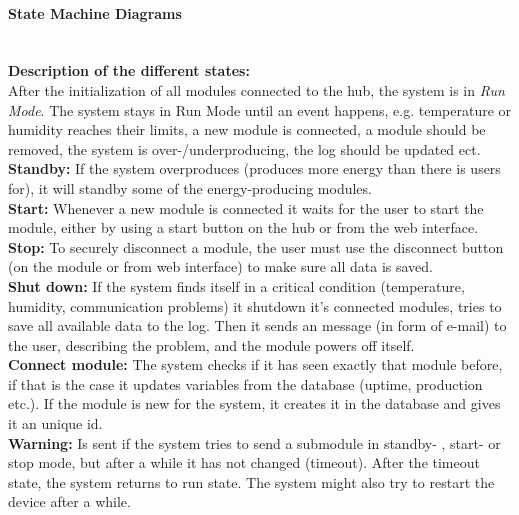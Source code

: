 			\paragraph{State Machine Diagrams}
				\textbf{ }\\
				\textbf{Description of the different states: }
				\\ After the initialization of all modules connected to the hub, the system is in  \textit{Run Mode}.
				The system stays in Run Mode until an event happens, e.g. temperature or humidity reaches their limits,
				a new module is connected, a module should be removed, the system is over-/underproducing, the log should be updated ect. 
				\\\textbf{Standby: }If the system overproduces (produces more energy than there is users for), it will standby some of the energy-producing modules.
				\\\textbf{Start: }Whenever a new module is connected it waits for the user to start the module, either by using a start button on the hub or from the web interface.
				\\\textbf{Stop: }To securely disconnect a module, the user must use the disconnect button (on the module or from web interface) to make sure all data is saved.
				\\\textbf{Shut down: }If the system finds itself in a critical condition (temperature, humidity, communication problems) it shutdown it's connected modules,
							        tries to save all available data to the log. Then it sends an message (in form of e-mail) to the user, describing the problem, and the module
							        powers off itself. 
				\\\textbf{Connect module: } The system checks if it has seen exactly that module before, if that is the case it updates variables from the database
									(uptime, production etc.). If the module is new for the system, it creates it in the database and gives it an unique id.
				\\\textbf{Warning: }Is sent if the system tries to send a submodule in standby- , start- or stop mode, but after a while it has not changed (timeout). 
							    After the timeout state, the system returns to run state. The system might also try to restart the device after a while.
			\newpage
